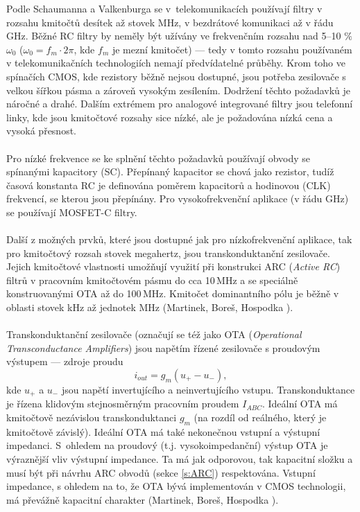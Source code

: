 Podle Schaumanna a Valkenburga \cite{13} se v~telekomunikacích používají filtry v rozsahu kmitočtů desítek až stovek MHz, v bezdrátové komunikaci až v řádu GHz. Běžné RC filtry by neměly být užívány ve frekvenčním rozsahu nad 5--10 $\%$ $\omega _0$ ($\omega _0 = f_m \cdot 2 \pi$, kde $f_m$ je mezní kmitočet) --- tedy v tomto rozsahu používaném v telekomunikačních technologiích nemají předvídatelné průběhy. Krom toho ve spínačích CMOS, kde rezistory běžně nejsou dostupné, jsou potřeba zesilovače s velkou šířkou pásma a zároveň vysokým zesílením. Dodržení těchto požadavků je náročné a drahé. Dalším extrémem pro analogové integrované filtry jsou telefonní linky, kde jsou kmitočtové rozsahy sice nízké, ale je požadována nízká cena a vysoká přesnost.\\
\\
Pro nízké frekvence se ke splnění těchto požadavků používají obvody se spínanými kapacitory (SC). Přepínaný kapacitor se chová jako rezistor, tudíž časová konstanta RC je definována poměrem kapacitorů a hodinovou (CLK) frekvencí, se kterou jsou přepínány. Pro vysokofrekvenční aplikace (v řádu GHz) se používají MOSFET-C filtry.\\
\\
Další z možných prvků, které jsou dostupné jak pro nízkofrekvenční aplikace, tak pro kmitočtový rozsah stovek megahertz, jsou transkonduktanční zesilovače. Jejich kmitočtové vlastnosti umožňují využití při konstrukci ARC (\textit{Active RC}) filtrů v pracovním kmitočtovém pásmu do cca 10\,MHz a se speciálně konstruovanými OTA až do 100\,MHz. Kmitočet dominantního pólu je běžně v oblasti stovek kHz až jednotek MHz (Martinek, Boreš, Hospodka \cite{12}).\\
\\
Transkonduktanční zesilovače (označují se též jako OTA (\textit{Operational Transconductance Amplifiers}) jsou napětím řízené zesilovače s proudovým výstupem --- zdroje proudu
\begin{equation}
i_{out} = g_m(u_+ - u_-),
\end{equation}
kde $u_+$ a $u_-$ jsou napětí invertujícího a neinvertujícího vstupu. Transkonduktance je řízena klidovým stejnosměrným pracovním proudem $I_{ABC}$. Ideální OTA má kmitočtově nezávislou transkonduktanci $g_m$ (na rozdíl od reálného, který je kmitočtově závislý). Ideální OTA má také nekonečnou vstupní a výstupní impedanci. S~ohledem na proudový (t.j. vysokoimpedanční) výstup OTA je výraznější vliv výstupní impedance. Ta má jak odporovou, tak kapacitní složku a musí být při návrhu ARC obvodů (sekce \ref{s:ARC}) respektována. Vstupní impedance, s ohledem na to, že OTA bývá implementován v CMOS technologii, má převážně kapacitní charakter (Martinek, Boreš, Hospodka \cite{12}).
